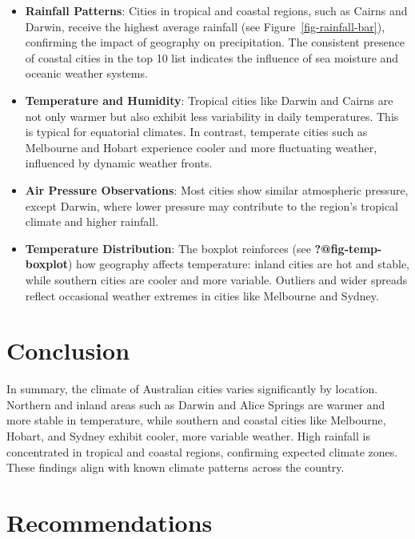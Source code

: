 \documentclass[
  letterpaper,
  DIV=11,
  numbers=noendperiod]{scrartcl}
\newenvironment{Shaded}{\begin{snugshade}}{\end{snugshade}}
\begin{document}
\begin{Shaded}
\begin{Highlighting}[]
\begin{Shaded}
\begin{Highlighting}[]
\begin{Shaded}
\begin{Highlighting}[]
\begin{Shaded}
\begin{Highlighting}[]
\begin{itemize}
\item
  \textbf{Rainfall Patterns}: Cities in tropical and coastal regions,
  such as Cairns and Darwin, receive the highest average rainfall (see
  Figure~\ref{fig-rainfall-bar}), confirming the impact of geography on
  precipitation. The consistent presence of coastal cities in the top 10
  list indicates the influence of sea moisture and oceanic weather
  systems.
\item
  \textbf{Temperature and Humidity}: Tropical cities like Darwin and
  Cairns are not only warmer but also exhibit less variability in daily
  temperatures. This is typical for equatorial climates. In contrast,
  temperate cities such as Melbourne and Hobart experience cooler and
  more fluctuating weather, influenced by dynamic weather fronts.
\item
  \textbf{Air Pressure Observations}: Most cities show similar
  atmospheric pressure, except Darwin, where lower pressure may
  contribute to the region's tropical climate and higher rainfall.
\item
  \textbf{Temperature Distribution}: The boxplot reinforces (see
  \textbf{?@fig-temp-boxplot}) how geography affects temperature: inland
  cities are hot and stable, while southern cities are cooler and more
  variable. Outliers and wider spreads reflect occasional weather
  extremes in cities like Melbourne and Sydney.
\end{itemize}

\section{Conclusion}\label{conclusion}

In summary, the climate of Australian cities varies significantly by
location. Northern and inland areas such as Darwin and Alice Springs are
warmer and more stable in temperature, while southern and coastal cities
like Melbourne, Hobart, and Sydney exhibit cooler, more variable
weather. High rainfall is concentrated in tropical and coastal regions,
confirming expected climate zones. These findings align with known
climate patterns across the country.

\section{Recommendations}\label{recommendations}


\end{Highlighting}
\end{Shaded}
\end{Highlighting}
\end{Shaded}
\end{Highlighting}
\end{Shaded}
\end{Highlighting}
\end{Shaded}
\end{document}
